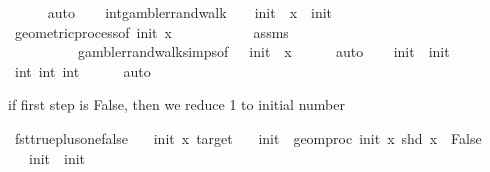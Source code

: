 \begin{isabellebody}
\ \ \ \ \isamarkupfalse%
\ auto\isanewline
\ \ \isamarkupfalse%
\ int{}{\isacharcolon}{\kern0pt}{\isachardoublequoteopen}gambler{\isacharunderscore}{\kern0pt}rand{\isacharunderscore}{\kern0pt}walk\ {}\ {\isacharparenleft}{\kern0pt}{\isacharminus}{\kern0pt}\ {}{\isacharparenright}{\kern0pt}\ init\ {}\ x\ {\isacharequal}{\kern0pt}\ init{\isacharprime}{\kern0pt}{\isachardoublequoteclose}\isanewline
\ \ \ \ \isamarkupfalse%
\ geometric{\isacharunderscore}{\kern0pt}process{\isacharbrackleft}{\kern0pt}of\ init\ x\ {}{\isacharbrackright}{\kern0pt}\isanewline
\ \ \ \ \ \ \ \ \ \ assms{\isacharparenleft}{\kern0pt}{}{\isacharparenright}{\kern0pt}\isanewline
\ \ \ \ \ \ \ \ \ \ gambler{\isacharunderscore}{\kern0pt}rand{\isacharunderscore}{\kern0pt}walk{\isachardot}{\kern0pt}simps{\isacharbrackleft}{\kern0pt}of\ {}\ {\isachardoublequoteopen}{\isacharminus}{\kern0pt}{}{\isachardoublequoteclose}\ init\ {}\ x{\isacharbrackright}{\kern0pt}\isanewline
\ \ \ \ \isamarkupfalse%
\ auto\isanewline
\ \ \isamarkupfalse%
\ {\isachardoublequoteopen}init{\isacharprime}{\kern0pt}\ {\isacharequal}{\kern0pt}\ init\ {\isacharplus}{\kern0pt}\ {}{\isachardoublequoteclose}\isanewline
\ \ \ \ \isamarkupfalse%
\ int{}\ int{}\ int{}\isanewline
\ \ \ \ \isamarkupfalse%
\ auto\isanewline
{}\isamarkupfalse%
%
\endisatagproof
{\isafoldproof}%
%
\isadelimproof
%
\endisadelimproof
%
\begin{isamarkuptext}%
if first step is False, then we reduce 1 to initial number%
\end{isamarkuptext}\isamarkuptrue%
\isamarkupfalse%
\ fst{\isacharunderscore}{\kern0pt}true{\isacharunderscore}{\kern0pt}plus{\isacharunderscore}{\kern0pt}one{\isacharunderscore}{\kern0pt}false{\isacharcolon}{\kern0pt}\isanewline
\ \ \ init\ x\ target\isanewline
\ \ \ {\isachardoublequoteopen}init{\isacharprime}{\kern0pt}\ {\isacharequal}{\kern0pt}\ geom{\isacharunderscore}{\kern0pt}proc\ init\ x\ {}{\isachardoublequoteclose}{\isachardoublequoteopen}shd\ x\ {\isacharequal}{\kern0pt}\ False{\isachardoublequoteclose}\isanewline
\ \ \ {\isachardoublequoteopen}init{\isacharprime}{\kern0pt}\ {\isacharequal}{\kern0pt}\ init\ {\isacharminus}{\kern0pt}\ {}{\isachardoublequoteclose}\isanewline

\end{isabellebody}
